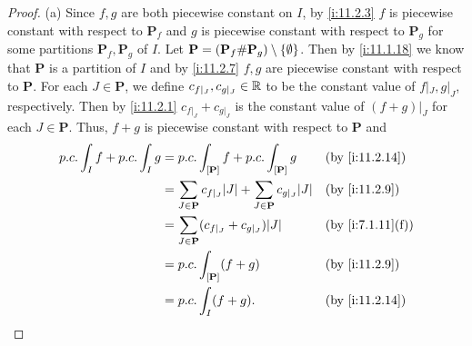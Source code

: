 \begin{proof}{(a)}
  Since \(f, g\) are both piecewise constant on \(I\), by \cref{i:11.2.3} \(f\) is piecewise constant with respect to \(\mathbf{P}_f\) and \(g\) is piecewise constant with respect to \(\mathbf{P}_g\) for some partitions \(\mathbf{P}_f, \mathbf{P}_g\) of \(I\).
  Let \(\mathbf{P} = (\mathbf{P}_f \# \mathbf{P}_g) \setminus \left\lbrace\emptyset\right\rbrace\).
  Then by \cref{i:11.1.18} we know that \(\mathbf{P}\) is a partition of \(I\) and by \cref{i:11.2.7} \(f, g\) are piecewise constant with respect to \(\mathbf{P}\).
  For each \(J \in \mathbf{P}\), we define \(c_{f|_J}, c_{g|_J} \in \mathbb{R}\) to be the constant value of \(f|_J, g|_J\), respectively.
  Then by \cref{i:11.2.1} \(c_{f|_J} + c_{g|_J}\) is the constant value of \((f + g)|_J\) for each \(J \in \mathbf{P}\).
  Thus, \(f + g\) is piecewise constant with respect to \(\mathbf{P}\) and
  \begin{align*}
    p.c. \int_I f + p.c. \int_I g & = p.c. \int_{[\mathbf{P}]} f + p.c. \int_{[\mathbf{P}]} g                             &  & \by{i:11.2.14}   \\
                                  & = \sum_{J \in \mathbf{P}} c_{f|_J} \abs{J} + \sum_{J \in \mathbf{P}} c_{g|_J} \abs{J} &  & \by{i:11.2.9}    \\
                                  & = \sum_{J \in \mathbf{P}} (c_{f|_J} + c_{g|_J}) \abs{J}                               &  & \by{i:7.1.11}[f] \\
                                  & = p.c. \int_{[\mathbf{P}]} (f + g)                                                    &  & \by{i:11.2.9}    \\
                                  & = p.c. \int_I (f + g).                                                                &  & \by{i:11.2.14}
  \end{align*}
\end{proof}

